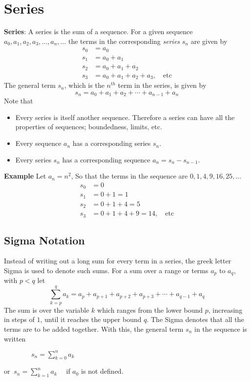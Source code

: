\documentclass[11pt,a4paper,titlepage,oneside,openany]{article}
\begin{document}
\section*{Series}



\noindent \textbf{Series}: A series is the sum of a sequence. For a given sequence $a_0,a_1,a_2,a_3,\ldots,a_n,\ldots$ the terms in the corresponding \emph{series} $s_n$ are given by
\begin{align*}
  s_0&=a_0\\
  s_1&=a_0+a_1\\
  s_2&=a_0+a_1+a_2\\
  s_3&=a_0+a_1+a_2+a_3,\quad \text{etc}
\end{align*}
The general term $s_n$, which is the $n^{th}$ term in the series, is given by
\begin{equation*}
  s_n=a_0+a_1+a_2+\cdots+a_{n-1}+a_n
\end{equation*}
Note that
\begin{itemize}
\item Every series is itself another sequence. Therefore a series can have all the properties of sequences; boundedness, limits, etc.
\item Every sequence $a_n$ has a corresponding series $s_n$.
\item Every series $s_n$ has a corresponding sequence $a_n=s_n-s_{n-1}$.
\end{itemize}
\noindent  \textbf{Example}
Let $a_n=n^2$, So that the terms in the sequence are $0,1,4,9,16,25,\ldots$
\begin{align*}
  s_0&=0\\
  s_1&=0+1=1\\
  s_2&=0+1+4=5\\
  s_3&=0+1+4+9=14,\quad \text{etc}
\end{align*}

\subsection*{Sigma Notation}
Instead of writing out a long sum for every term in a series, the greek letter Sigma is used to denote such sums. For a sum over a range or terms $a_p$ to $a_q$, with $p<q$ let
\begin{equation*}
  \sum_{k=p}^{q}a_k = a_p+a_{p+1}+a_{p+2}+a_{p+3}+\cdots+a_{q-1}+a_q
\end{equation*}
The sum is over the variable $k$ which ranges from the lower bound $p$, increasing in steps of $1$, until it reaches the upper bound $q$. The Sigma denotes that all the terms are to be added together. With this, the general term $s_n$ in the sequence is written
\begin{multicols}{2}
$\qquad \qquad s_n=\displaystyle \sum_{k=0}^n a_k$
\columnbreak

or $\ s_n=\displaystyle \sum_{k=1}^n a_k\quad $ if $a_0$ is not defined.
\end{multicols}
\pagebreak
\end{document}
